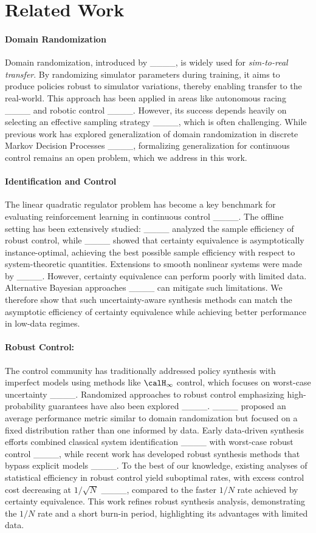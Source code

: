 \section{Related Work}
\paragraph{Domain Randomization} 
Domain randomization, introduced by ____, is widely used for \emph{sim-to-real transfer}. By randomizing simulator parameters during training, it aims to produce policies robust to simulator variations, thereby enabling transfer to the real-world. This approach has been applied in areas like autonomous racing ____
and robotic control ____. However, its success depends heavily on selecting an effective sampling strategy ____, which is often challenging. While previous work has explored generalization of domain randomization in discrete Markov Decision Processes ____, formalizing generalization for continuous control remains an open problem, which we address in this work.
\vspace{-3pt}
\paragraph{Identification and Control} The linear quadratic regulator problem has become a key benchmark for evaluating reinforcement learning in continuous control ____. The offline setting has been extensively studied: ____ analyzed the sample efficiency of robust control, while ____ showed that certainty equivalence is asymptotically instance-optimal, achieving the best possible sample efficiency with respect to system-theoretic quantities. Extensions to smooth nonlinear systems were made by ____. However, certainty equivalence can perform poorly with limited data. Alternative Bayesian approaches ____ can mitigate such limitations. We therefore show that such uncertainty-aware synthesis methods can match the asymptotic efficiency of certainty equivalence while achieving better performance in low-data regimes.
\vspace{-3pt}
\paragraph{Robust Control:} The control community has traditionally addressed policy synthesis with imperfect models using methods like $\calH_\infty$ control, which focuses on worst-case uncertainty ____. Randomized approaches to robust control emphasizing high-probability guarantees have also been explored ____. ____ proposed an average performance metric similar to domain randomization but focused on a fixed distribution rather than one informed by data. Early data-driven synthesis efforts combined classical system identification ____ with worst-case robust control ____, while recent work has developed robust synthesis methods that bypass explicit models ____. To the best of our knowledge, existing analyses of statistical efficiency in robust control yield suboptimal rates, with excess control cost decreasing at $1/\sqrt{N}$ ____, compared to the faster $1/N$ rate achieved by certainty equivalence. This work refines robust synthesis analysis, demonstrating the $1/N$ rate and a short burn-in period, highlighting its advantages with limited data.